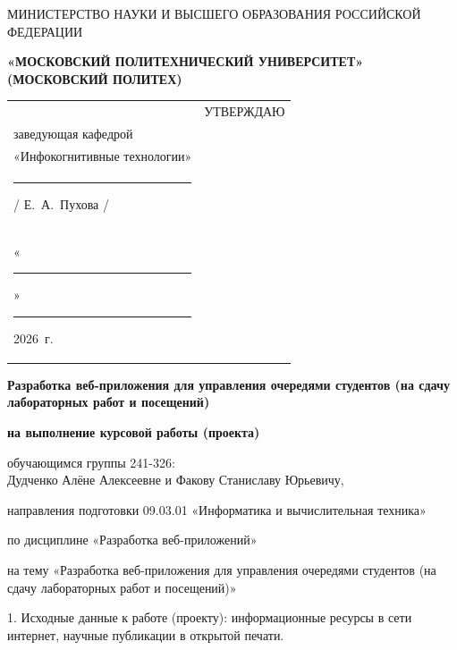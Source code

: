 \documentclass[14pt, a4paper]{extarticle}
\begin{document}
\pagestyle{empty}


\begin{center}
    {\small МИНИСТЕРСТВО НАУКИ И ВЫСШЕГО ОБРАЗОВАНИЯ РОССИЙСКОЙ ФЕДЕРАЦИИ}


    {\small \textbf{«МОСКОВСКИЙ ПОЛИТЕХНИЧЕСКИЙ УНИВЕРСИТЕТ»}} \\
    {\small \textbf{(МОСКОВСКИЙ ПОЛИТЕХ)}}
\end{center}

\begin{tabularx}{\textwidth}{@{} p{} p{} @{}}
    &
    \raggedright
    УТВЕРЖДАЮ                          \\
    заведующая кафедрой                \\
    «Инфокогнитивные технологии»       \\[0.3cm]

    \rule{3cm}{0.4pt} / Е.~А.~Пухова / \\[0.1cm]

    «\rule{0.8cm}{0.4pt}» \rule{3cm}{0.4pt} 2026~г.
\end{tabularx}


\begin{center}
    { \large \textbf{Разработка веб-приложения для управления очередями студентов (на сдачу лабораторных работ и посещений)}}

    \textbf{на выполнение курсовой работы (проекта)}

    обучающимся группы 241-326: \\
    Дудченко Алёне Алексеевне и Факову Станиславу Юрьевичу,

    направления подготовки 09.03.01 «Информатика и вычислительная техника»

    по дисциплине «Разработка веб-приложений»

    на тему «Разработка веб-приложения для управления очередями студентов (на сдачу лабораторных работ и посещений)»
\end{center}

1. Исходные данные к работе (проекту): информационные ресурсы в сети интернет, научные публикации в открытой печати.
\end{document}
